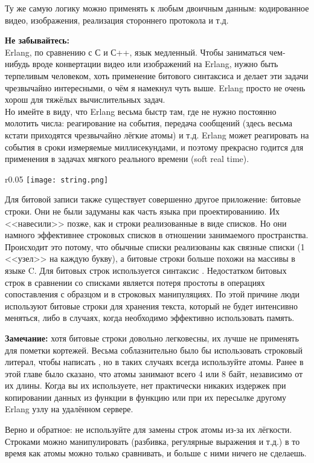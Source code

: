 Ту же самую логику можно применять к любым двоичным данным: кодированное видео, изображения, реализация стороннего протокола и т.д.\\ 
\colorbox{lorange}
{
    \begin{minipage}{\linewidth}
        \textbf{Не забывайтесь:}\\ 
        Erlang, по сравнению с С и С++, язык медленный. Чтобы заниматься чем\--нибудь вроде конвертации видео или изображений на Erlang, нужно быть терпеливым человеком, хоть применение битового синтаксиса и делает эти задачи чрезвычайно интересными, о чём я намекнул чуть выше. Erlang просто не очень хорош для тяжёлых вычислительных задач.\\ 
        Но имейте в виду, что Erlang весьма быстр там, где не нужно постоянно молотить числа: реагирование на события, передача сообщений (здесь весьма кстати приходятся чрезвычайно лёгкие атомы) и т.д. Erlang может реагировать на события в сроки измеряемые миллисекундами, и поэтому прекрасно годится для применения в задачах мягкого реального времени (soft real time).\\ 
    \end{minipage}
}

\begin{wrapfigure}{r}{0.05\textwidth}
    \texttt{[image: string.png]}
\end{wrapfigure}

Для битовой записи также существует совершенно другое приложение: битовые строки. Они не были задуманы как часть языка при проектированиию. Их <<навесили>> позже, как и строки реализованные в виде списков. Но они намного эффективнее строковых списков в отношении занимаемого пространства. Происходит это потому, что обычные списки реализованы как связные списки (1 <<узел>> на каждую букву), а битовые строки больше похожи на массивы в языке C. Для битовых строк используется синтаксис . Недостатком битовых строк в сравнении со списками является потеря простоты в операциях сопоставления с образцом и в строковых манипуляциях. По этой причине люди используют битовые строки для хранения текста, который не будет интенсивно меняться, либо в случаях, когда необходимо эффективно использовать память.\\ 
\colorbox{lgray}{
    \begin{minipage}{\linewidth}
        \textbf{Замечание:} хотя битовые строки довольно легковесны, их лучше не применять для пометки кортежей. Весьма соблазнительно было бы использовать строковый литерал, чтобы написать , но в таких случаях всегда используйте атомы. Ранее в этой главе было сказано, что атомы занимают всего 4 или 8 байт, независимо от их длины. Когда вы их используете, нет практически никаких издержек при копировании данных из функции в функцию или при их пересылке другому Erlang узлу на удалённом сервере.
        
        Верно и обратное: не используйте для замены строк атомы из\--за их лёгкости. Строками можно манипулировать (разбивка, регулярные выражения и т.д.) в то время как атомы можно только сравнивать, и больше с ними ничего не сделаешь.
    \end{minipage}
}
